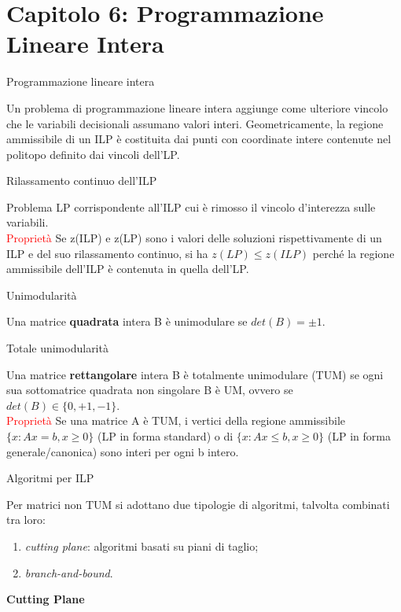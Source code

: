 \documentclass[answers, a4paper, 11pt]{exam}
\begin{document}
\section{Capitolo 6: Programmazione Lineare Intera}
\begin{questions}
\question Programmazione lineare intera
\begin{solution}
Un problema di programmazione lineare intera aggiunge come ulteriore vincolo che le variabili decisionali assumano valori interi. Geometricamente, la regione ammissibile di un ILP è costituita dai punti con coordinate intere contenute nel politopo definito dai vincoli dell'LP.
\end{solution}
\question Rilassamento continuo dell'ILP
\begin{solution}
Problema LP corrispondente all'ILP cui è rimosso il vincolo d'interezza sulle variabili.\\
\textcolor{red}{Proprietà} Se z(ILP) e z(LP) sono i valori delle soluzioni rispettivamente di un ILP e del suo rilassamento continuo, si ha $z(LP)\le z(ILP)$ perché la regione ammissibile dell'ILP è contenuta in quella dell'LP.
\end{solution}
\question Unimodularità
\begin{solution}
Una matrice \textbf{quadrata} intera B è unimodulare se $det(B)= \pm 1$.
\end{solution}
\question Totale unimodularità
\begin{solution}
Una matrice \textbf{rettangolare} intera B è totalmente unimodulare (TUM) se ogni sua sottomatrice quadrata non singolare B è UM, ovvero se $det(B) \in \{0,+1,-1\}$.\\
\textcolor{red}{Proprietà} Se una matrice A è TUM, i vertici della regione ammissibile $\{x: Ax = b, x \ge 0\}$ (LP in forma standard) o di $\{x: Ax \le b, x \ge 0\}$ (LP in forma generale/canonica) sono interi per ogni b intero.
\end{solution}
\question Algoritmi per ILP
\begin{solution}
Per matrici non TUM si adottano due tipologie di algoritmi, talvolta combinati tra loro:
\begin{enumerate}
\item \emph{cutting plane}: algoritmi basati su piani di taglio;
\item \emph{branch-and-bound}.
\end{enumerate}
\end{solution}
\question \textbf{Cutting Plane}
\begin{solution}

\end{solution}
\end{questions}
\end{document}
